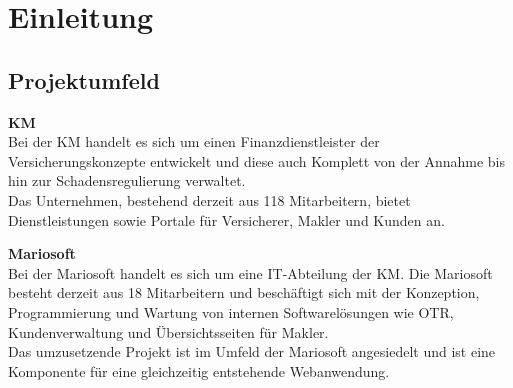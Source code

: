 
\section{Einleitung}
\label{einleitung}

\subsection{Projektumfeld}
\label{projektumfeld}
\textbf{\acl{KM}}
\\

Bei der \ac{KM} handelt es sich um einen Finanzdienstleister der Versicherungskonzepte entwickelt und diese auch Komplett von der Annahme bis hin zur Schadensregulierung verwaltet.\\
Das Unternehmen, bestehend derzeit aus 118 Mitarbeitern, bietet Dienstleistungen sowie Portale für Versicherer, Makler und Kunden an.

\textbf{Mariosoft}
\\

Bei der Mariosoft handelt es sich um eine IT-Abteilung der \ac{KM}. Die Mariosoft besteht derzeit aus 18 Mitarbeitern und beschäftigt sich mit der Konzeption, Programmierung und Wartung von internen Softwarelösungen wie \ac{OTR}, Kundenverwaltung und Übersichtsseiten für Makler.
\\
Das umzusetzende Projekt ist im Umfeld der Mariosoft angesiedelt und ist eine Komponente für eine gleichzeitig entstehende Webanwendung.

